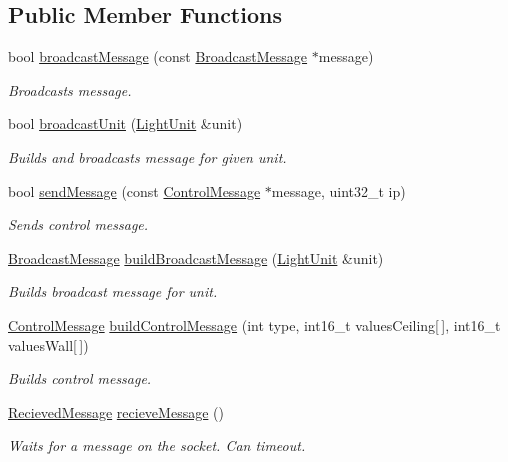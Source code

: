 \subsection*{Public Member Functions}
\begin{DoxyCompactItemize}
\item 
bool \mbox{\hyperlink{classNetworkHandler_a3296b0356692982086aacad3f34b7c12}{broadcast\+Message}} (const \mbox{\hyperlink{structNetworkHandler_1_1BroadcastMessage}{Broadcast\+Message}} $\ast$message)
\begin{DoxyCompactList}\small\item\em Broadcasts message. \end{DoxyCompactList}\item 
bool \mbox{\hyperlink{classNetworkHandler_a515ae3ef779f2244cfdcccbbb24c8cb2}{broadcast\+Unit}} (\mbox{\hyperlink{classLightUnit}{Light\+Unit}} \&unit)
\begin{DoxyCompactList}\small\item\em Builds and broadcasts message for given unit. \end{DoxyCompactList}\item 
bool \mbox{\hyperlink{classNetworkHandler_ae424a6a062dd0244560908d8de1798d0}{send\+Message}} (const \mbox{\hyperlink{structNetworkHandler_1_1ControlMessage}{Control\+Message}} $\ast$message, uint32\+\_\+t ip)
\begin{DoxyCompactList}\small\item\em Sends control message. \end{DoxyCompactList}\item 
\mbox{\hyperlink{structNetworkHandler_1_1BroadcastMessage}{Broadcast\+Message}} \mbox{\hyperlink{classNetworkHandler_a0e8984b42f72b35466d409319c938e4d}{build\+Broadcast\+Message}} (\mbox{\hyperlink{classLightUnit}{Light\+Unit}} \&unit)
\begin{DoxyCompactList}\small\item\em Builds broadcast message for unit. \end{DoxyCompactList}\item 
\mbox{\hyperlink{structNetworkHandler_1_1ControlMessage}{Control\+Message}} \mbox{\hyperlink{classNetworkHandler_ac43127d9c50aeba5c9bbc853bef447a9}{build\+Control\+Message}} (int type, int16\+\_\+t values\+Ceiling\mbox{[}$\,$\mbox{]}, int16\+\_\+t values\+Wall\mbox{[}$\,$\mbox{]})
\begin{DoxyCompactList}\small\item\em Builds control message. \end{DoxyCompactList}\item 
\mbox{\hyperlink{structNetworkHandler_1_1RecievedMessage}{Recieved\+Message}} \mbox{\hyperlink{classNetworkHandler_a0c605f9d3c9ae3d7d55c1edffdba7d84}{recieve\+Message}} ()
\begin{DoxyCompactList}\small\item\em Waits for a message on the socket. Can timeout. \end{DoxyCompactList}\end{DoxyCompactItemize}


